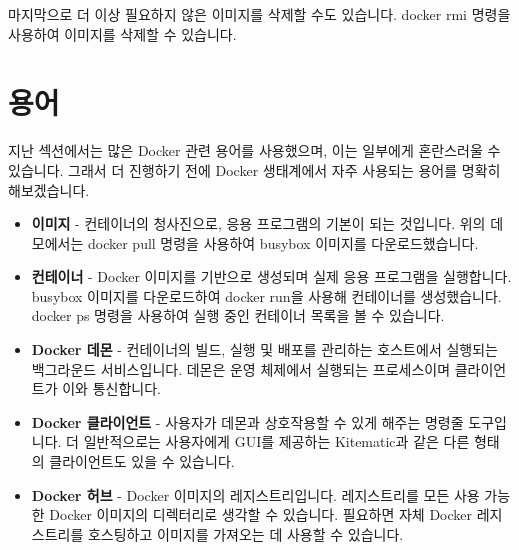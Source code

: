 마지막으로 더 이상 필요하지 않은 이미지를 삭제할 수도 있습니다. docker rmi 명령을 사용하여 이미지를 삭제할 수 있습니다.

\section{용어}
지난 섹션에서는 많은 Docker 관련 용어를 사용했으며, 이는 일부에게 혼란스러울 수 있습니다. 그래서 더 진행하기 전에 Docker 생태계에서 자주 사용되는 용어를 명확히 해보겠습니다.
\begin{itemize}
    \item \textbf{이미지} - 컨테이너의 청사진으로, 응용 프로그램의 기본이 되는 것입니다. 위의 데모에서는 docker pull 명령을 사용하여 busybox 이미지를 다운로드했습니다.
    \item \textbf{컨테이너} - Docker 이미지를 기반으로 생성되며 실제 응용 프로그램을 실행합니다. busybox 이미지를 다운로드하여 docker run을 사용해 컨테이너를 생성했습니다. docker ps 명령을 사용하여 실행 중인 컨테이너 목록을 볼 수 있습니다.
    \item \textbf{Docker 데몬} - 컨테이너의 빌드, 실행 및 배포를 관리하는 호스트에서 실행되는 백그라운드 서비스입니다. 데몬은 운영 체제에서 실행되는 프로세스이며 클라이언트가 이와 통신합니다.
    \item \textbf{Docker 클라이언트} - 사용자가 데몬과 상호작용할 수 있게 해주는 명령줄 도구입니다. 더 일반적으로는 사용자에게 GUI를 제공하는 Kitematic과 같은 다른 형태의 클라이언트도 있을 수 있습니다.
    \item \textbf{Docker 허브} - Docker 이미지의 레지스트리입니다. 레지스트리를 모든 사용 가능한 Docker 이미지의 디렉터리로 생각할 수 있습니다. 필요하면 자체 Docker 레지스트리를 호스팅하고 이미지를 가져오는 데 사용할 수 있습니다.
\end{itemize}